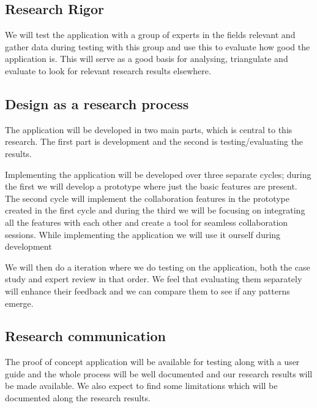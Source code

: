 \subsection{Research Rigor}
 We will test the application with a group of experts in the fields relevant and gather data during testing with this group and use this to evaluate how good the application is. This will serve as a good basis for analysing, triangulate and evaluate to look for relevant research results elsewhere.
\subsection{Design as a research process}
The application will be developed in two main parts, which is central to this research. The first part is development and the second is testing/evaluating the results.

Implementing the application will be developed over three separate cycles; during the first we will develop a prototype where just the basic features are present. The second cycle will implement the collaboration features in the prototype created in the first cycle and during the third we will be focusing on integrating all the features with each other and create a tool for seamless collaboration sessions. While implementing the application we will use it ourself during development

We will then do a iteration where we do testing on the application, both the case study and expert review in that order. We feel that evaluating them separately will enhance their feedback and we can compare them to see if any patterns emerge.
\subsection{Research communication}
The proof of concept application will be available for testing along with a user guide and the whole process will be well documented and our research results will be made available.
We also expect to find some limitations which will be documented along the research results.